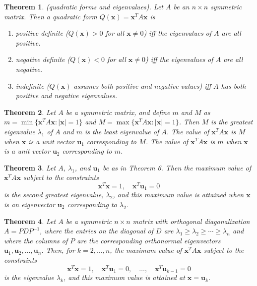 \documentclass{article}
\theoremstyle{plain}
\newtheorem{thm}{Theorem}[section]
\theoremstyle{definition}
\theoremstyle{remark}
\begin{document}
\begin{thm} (quadratic forms and eigenvalues).
    Let \(A\) be an \(n\times n\) symmetric matrix. Then a quadratic form \(Q(\textbf{x})=\textbf{x}^TA\textbf{x}\) is
    \begin{enumerate}
        \item[a.] positive definite (\(Q(\textbf{x})>0\) for all \(\textbf{x}\neq0\)) iff the eigenvalues of \(A\) are all positive.
        \item[b.] negative definite (\(Q(\textbf{x})<0\) for all \(\textbf{x}\neq0\)) iff the eigenvalues of \(A\) are all negative.
        \item[c.] indefinite (\(Q(\textbf{x})\) assumes both positive and negative values) iff \(A\) has both positive and negative eigenvalues.
    \end{enumerate}
\end{thm}

\begin{thm}
    Let \(A\) be a symmetric matrix, and define \(m\) and \(M\) as \(m=\min\{\textbf{x}^TA\textbf{x}:|\textbf{x}|=1\}\) and \(M=\max\{\textbf{x}^TA\textbf{x}:|\textbf{x}|=1\}\). Then \(M\) is the greatest eigenvalue \(\lambda_1\) of \(A\) and \(m\) is the least eigenvalue of \(A\). The value of \(\textbf{x}^TA\textbf{x}\) is \(M\) when \(\textbf{x}\) is a unit vector \(\textbf{u}_1\) corresponding to \(M\). The value of \(\textbf{x}^TA\textbf{x}\) is \(m\) when \(\textbf{x}\) is a unit vector \(\textbf{u}_2\) corresponding to \(m\).
\end{thm}

\begin{thm}
    Let \(A\), \(\lambda_1\), and \(\textbf{u}_1\) be as in Theorem 6. Then the maximum value of \(\textbf{x}^TA\textbf{x}\) subject to the constraints \[\textbf{x}^T\textbf{x}=1,\quad\textbf{x}^T\textbf{u}_1=0\] is the second greatest eigenvalue, \(\lambda_2\), and this maximum value is attained when \(\textbf{x}\) is an eigenvector \(\textbf{u}_2\) corresponding to \(\lambda_2\).
\end{thm}

\begin{thm}
    Let \(A\) be a symmetric \(n \times n\) matrix with orthogonal diagonalization \(A = PDP^{-1}\), where the entries on the diagonal of \(D\) are \(\lambda_1 \geq \lambda_2 \geq \cdots \geq \lambda_n\) and where the columns of \(P\) are the corresponding orthonormal eigenvectors \(\textbf{u}_1, \textbf{u}_2, \ldots, \textbf{u}_n\). Then, for \(k = 2, \ldots, n\), the maximum value of \(\textbf{x}^T A \textbf{x}\) subject to the constraints
    \[
    \textbf{x}^T \textbf{x} = 1, \quad \textbf{x}^T \textbf{u}_1 = 0, \quad \ldots, \quad \textbf{x}^T \textbf{u}_{k-1} = 0
    \]
    is the eigenvalue \(\lambda_k\), and this maximum value is attained at \(\textbf{x} = \textbf{u}_k\).
\end{thm}
\end{document}
